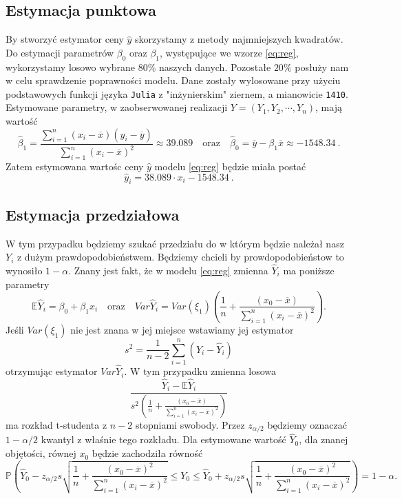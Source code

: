 \documentclass[12pt,leqno]{article}
\theoremstyle{exer}
\begin{document}
	\subsection{Estymacja punktowa}
	By stworzyć estymator ceny $\hat y$ skorzystamy z metody najmniejszych kwadratów. Do estymacji parametrów $\beta_0$ oraz $\beta_1$, występujące we wzorze \eqref{eq:reg}, wykorzystamy losowo wybrane $80\%$ naszych danych. Pozostałe $20\%$ posłuży nam w celu sprawdzenie poprawności modelu. Dane zostały wylosowane przy użyciu podstawowych funkcji języka \verb|Julia| z "inżynierskim" ziernem, a mianowicie \verb|1410|. Estymowane parametry, w zaobserwowanej realizacji $Y=(Y_1, Y_2,\cdots,Y_n)$, mają wartość
	\begin{equation}
		\hat\beta_1=\frac{\sum_{i=1}^n\left(x_i-\overline{x}\right)\left(y_i-\overline{y}\right)}
		{\sum_{i=1}^n\left(x_i-\overline{x}\right)^2}\approx39.089 \quad \text{oraz} \quad
		\hat\beta_0=\overline{y}-\beta_1\overline{x}\approx-1548.34\ .
	\end{equation}
	Zatem estymowana wartośc ceny $\hat y$ modelu \eqref{eq:reg} będzie miała postać
	\begin{equation}\label{eq:reg_model}
		\hat y_i = 38.089\cdot x_i -1548.34\ .
	\end{equation}
	\subsection{Estymacja przedziałowa}
	W tym przypadku będziemy szukać przedziału do w którym będzie należał nasz $Y_i$ z dużym prawdopodobieństwem. Będziemy chcieli by prowdopodobieństow to wynosiło $1-\alpha$. Znany jest fakt, że w modelu \eqref{eq:reg} zmienna $\hat{Y}_i$ ma poniższe parametry
	\begin{equation}
		\mathbb{E}\hat Y_i = \beta_0+\beta_1x_i \quad\text{oraz}\quad Var \hat Y_i=Var\left(\xi_1\right)\left(\frac{1}{n}+\frac{(x_0-\overline{x})}{\sum_{i=1}^{n}\left(x_i-\overline{x}\right)^2}\right).
	\end{equation} 
	Jeśli $Var\left(\xi_1\right)$ nie jest znana w jej miejsce wstawiamy jej estymator
	\begin{equation}
		s^2=\frac{1}{n-2}\sum_{i=1}^{n}\left(Y_i-\hat Y_i\right)
	\end{equation}
	otrzymując estymator $Var \hat Y_i$. W tym przypadku zmienna losowa
	\begin{equation}
		\frac{\hat Y_i-\mathbb{E}\hat Y_i}{s^2\left(\frac{1}{n}+\frac{(x_0-\overline{x})}{\sum_{i=1}^{n}\left(x_i-\overline{x}\right)^2}\right)}
	\end{equation}
	ma rozkład t-studenta z $n-2$ stopniami swobody. Przez $z_{\alpha/2}$ będziemy oznaczać $1-\alpha/2$ kwantyl z właśnie tego rozkładu. Dla estymowane wartość $\hat Y_0$, dla znanej objętości, równej $x_0$ będzie zachodziła równość
	\begin{equation}
		\mathbb{P}\left(\hat Y_0 - z_{\alpha/2}s\sqrt{\frac{1}{n}+\frac{\left(x_0-\overline{x}\right)^2}{\sum_{i=1}^n\left(x_i-\overline{x}\right)^2}}\leq Y_0\leq\hat Y_0 + z_{\alpha/2}s\sqrt{\frac{1}{n}+\frac{\left(x_0-\overline{x}\right)^2}{\sum_{i=1}^n\left(x_i-\overline{x}\right)^2}}\right)=1-\alpha.
	\end{equation}
\end{document}
